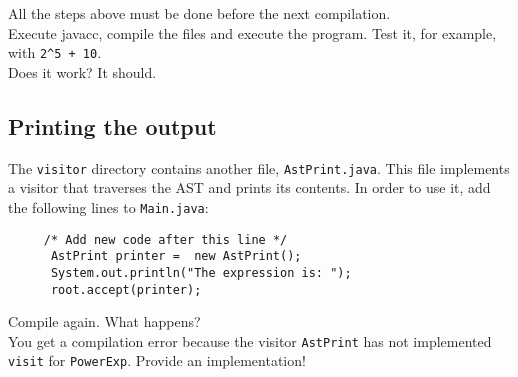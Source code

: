 \documentclass{article}
\begin{document}
\noindent All the steps above must be done before the next compilation. \\
Execute javacc, compile the files and execute the program. Test it, for example, with \verb?2^5 + 10?. \\
Does it work? It should.

\subsection*{Printing the output}

The {\tt visitor} directory contains another file, {\tt AstPrint.java}. This file implements a visitor that traverses the AST and prints its contents. In order to use it, add the following lines to {\tt Main.java}:

\begin{verbatim}
     /* Add new code after this line */
      AstPrint printer =  new AstPrint();
      System.out.println("The expression is: ");
      root.accept(printer);
\end{verbatim}

Compile again. What happens?\\
You get a compilation error because the visitor {\tt AstPrint} has not implemented {\tt visit} for {\tt PowerExp}. Provide an implementation!
\end{document}
